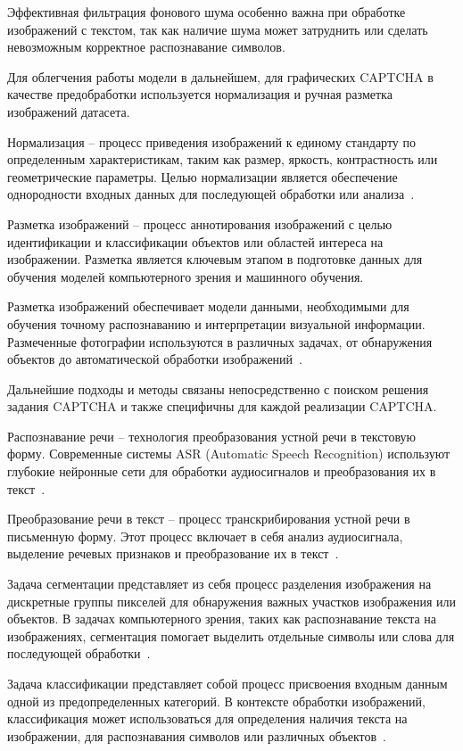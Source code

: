 Эффективная фильтрация фонового шума особенно важна при обработке изображений с 
текстом, так как наличие шума может затруднить или сделать невозможным корректное 
распознавание символов.

Для облегчения работы модели в дальнейшем, для графических CAPTCHA в качестве 
предобработки используется нормализация и ручная разметка изображений датасета.

Нормализация -- процесс приведения изображений к единому стандарту по 
определенным характеристикам, таким как размер, яркость, контрастность или 
геометрические параметры. Целью нормализации является обеспечение однородности 
входных данных для последующей обработки или анализа~\cite{gonzalez}.

Разметка изображений -- процесс аннотирования изображений с целью идентификации 
и классификации объектов или областей интереса на изображении. Разметка является 
ключевым этапом в подготовке данных для обучения моделей компьютерного зрения и 
машинного обучения.

Разметка изображений обеспечивает модели данными, необходимыми для обучения 
точному распознаванию и интерпретации визуальной информации. Размеченные 
фотографии используются в различных задачах, от обнаружения объектов до 
автоматической обработки изображений~\cite{annotation}.

Дальнейшие подходы и методы связаны непосредственно с поиском решения задания 
CAPTCHA и также специфичны для каждой реализации CAPTCHA.

Распознавание речи -- технология преобразования устной речи в текстовую форму. 
Современные системы ASR (Automatic Speech Recognition) используют глубокие 
нейронные сети для обработки аудиосигналов и преобразования их в текст~\cite{asr}.

Преобразование речи в текст -- процесс транскрибирования устной речи в письменную 
форму. Этот процесс включает в себя анализ аудиосигнала, выделение речевых 
признаков и преобразование их в текст~\cite{speechtotext}.

Задача сегментации представляет из себя процесс разделения изображения на 
дискретные группы пикселей для обнаружения важных участков изображения или 
объектов. В задачах компьютерного зрения, таких как распознавание текста на 
изображениях, сегментация помогает выделить отдельные символы или слова для 
последующей обработки~\cite{segmentation}.

Задача классификации представляет собой процесс присвоения входным данным одной 
из предопределенных категорий. В контексте обработки изображений, классификация 
может использоваться для определения наличия текста на изображении, для 
распознавания символов или различных объектов~\cite{classification}.

